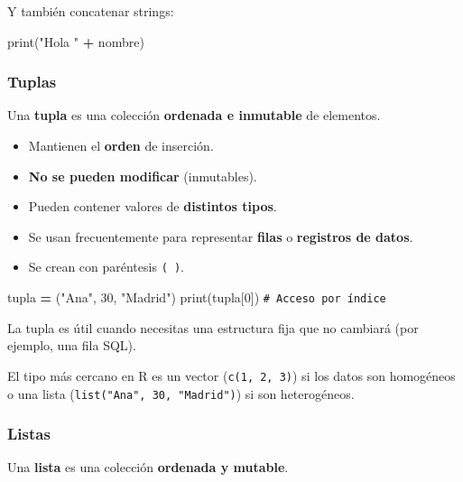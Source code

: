 \documentclass[
]{book}
\newenvironment{Shaded}{\begin{snugshade}}{\end{snugshade}}
\newcommand{\BuiltInTok}[1]{#1}
\newcommand{\CommentTok}[1]{\textcolor[rgb]{0.56,0.35,0.01}{\textit{#1}}}
\newcommand{\DecValTok}[1]{\textcolor[rgb]{0.00,0.00,0.81}{#1}}
\newcommand{\NormalTok}[1]{#1}
\newcommand{\OperatorTok}[1]{\textcolor[rgb]{0.81,0.36,0.00}{\textbf{#1}}}
\newcommand{\StringTok}[1]{\textcolor[rgb]{0.31,0.60,0.02}{#1}}
\providecommand{\tightlist}{%
  \setlength{\itemsep}{0pt}\setlength{\parskip}{0pt}}
\theoremstyle{break}
\theoremstyle{nonumberplain}
\renewcommand{\CommentTok}[1]{\textcolor[rgb]{0.41,0.41,0.41}{\texttt{#1}}}
\begin{document}
Y también concatenar strings:

\begin{Shaded}
\begin{Highlighting}[]
\BuiltInTok{print}\NormalTok{(}\StringTok{"Hola "} \OperatorTok{+}\NormalTok{ nombre)}
\end{Highlighting}
\end{Shaded}

\subsubsection{Tuplas}\label{tuplas}

Una \textbf{tupla} es una colección \textbf{ordenada e inmutable} de elementos.

\begin{itemize}
\tightlist
\item
  Mantienen el \textbf{orden} de inserción.
\item
  \textbf{No se pueden modificar} (inmutables).
\item
  Pueden contener valores de \textbf{distintos tipos}.
\item
  Se usan frecuentemente para representar \textbf{filas} o \textbf{registros de datos}.
\item
  Se crean con paréntesis \texttt{(\ )}.
\end{itemize}

\begin{Shaded}
\begin{Highlighting}[]
\NormalTok{tupla }\OperatorTok{=}\NormalTok{ (}\StringTok{"Ana"}\NormalTok{, }\DecValTok{30}\NormalTok{, }\StringTok{"Madrid"}\NormalTok{)}
\BuiltInTok{print}\NormalTok{(tupla[}\DecValTok{0}\NormalTok{])   }\CommentTok{\# Acceso por índice}
\end{Highlighting}
\end{Shaded}

La tupla es útil cuando necesitas una estructura fija que no cambiará (por ejemplo, una fila SQL).

El tipo más cercano en R es un vector (\texttt{c(1,\ 2,\ 3)}) si los datos son homogéneos o una lista (\texttt{list("Ana",\ 30,\ "Madrid")}) si son heterogéneos.

\subsubsection{Listas}\label{listas}

Una \textbf{lista} es una colección \textbf{ordenada y mutable}.
\end{document}
